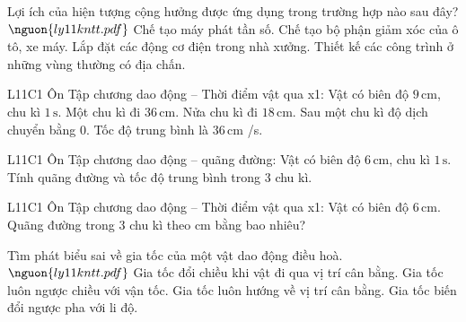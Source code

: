 \begin{ex}
Lợi ích của hiện tượng cộng hưởng được ứng dụng trong trường hợp nào sau đây? $\nguon{ly11 kntt.pdf}$
\choice
{\True Chế tạo máy phát tần số.}
{Chế tạo bộ phận giảm xóc của ô tô, xe máy.}
{Lắp đặt các động cơ điện trong nhà xưởng.}
{Thiết kế các công trình ở những vùng thường có địa chấn.}
\end{ex}

\begin{ex}
L11C1 Ôn Tập chương dao động – Thời điểm vật qua x1: Vật có biên độ $9\,\text{cm}$, chu kì $1\,\text{s}$.
\choiceTF
{\True Một chu kì đi $36\,\text{cm}$.}
{\True Nửa chu kì đi $18\,\text{cm}$.}
{\True Sau một chu kì độ dịch chuyển bằng 0.}
{\True Tốc độ trung bình là $36\,\text{cm}$ /s.}
\end{ex}

\begin{ex}
L11C1 Ôn Tập chương dao động – quãng đường: Vật có biên độ $6\,\text{cm}$, chu kì $1\,\text{s}$. Tính quãng đường và tốc độ trung bình trong 3 chu kì.
\choiceTF

\end{ex}

\begin{ex}
L11C1 Ôn Tập chương dao động – Thời điểm vật qua x1: Vật có biên độ $6\,\text{cm}$. Quãng đường trong 3 chu kì theo cm bằng bao nhiêu?
\end{ex}

\begin{ex}
Tìm phát biểu sai về gia tốc của một vật dao động điều hoà. $\nguon{ly11 kntt.pdf}$
\choice
{Gia tốc đổi chiều khi vật đi qua vị trí cân bằng.}
{\True Gia tốc luôn ngược chiều với vận tốc.}
{Gia tốc luôn hướng về vị trí cân bằng.}
{Gia tốc biến đổi ngược pha với li độ.}
\end{ex}


